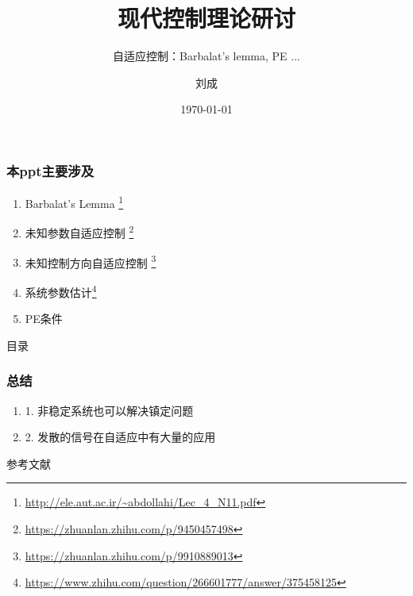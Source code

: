 \documentclass{beamer}
\title{现代控制理论研讨}
\subtitle{自适应控制：Barbalat's lemma, PE ...}
\author{刘成}
\institute{中山大学 航空航天学院}
\date{\today}
\begin{document}
\begin{frame}
  \titlepage
\end{frame}

\begin{frame}
  \frametitle{本ppt主要涉及}
  \begin{enumerate}
    \item Barbalat's Lemma \footnote{\url{http://ele.aut.ac.ir/~abdollahi/Lec_4_N11.pdf}}
    \item 未知参数自适应控制 \footnote{\url{https://zhuanlan.zhihu.com/p/9450457498}}
    \item 未知控制方向自适应控制 \footnote{\url{https://zhuanlan.zhihu.com/p/9910889013}}
    \item 系统参数估计\footnote{\url{https://www.zhihu.com/question/266601777/answer/375458125}}
    \item PE条件 
  \end{enumerate}
\end{frame}

\begin{frame}{目录}
  \tableofcontents[sectionstyle=show/shaded, subsectionstyle=show/show/shaded]
\end{frame}






\begin{frame}
  \frametitle{总结}
  \begin{enumerate}
    \item 1. 非稳定系统也可以解决镇定问题
    \item 2. 发散的信号在自适应中有大量的应用
  \end{enumerate}
  
\end{frame}

\begin{frame}[allowframebreaks]{参考文献}
  \printbibliography
\end{frame}
\end{document}
